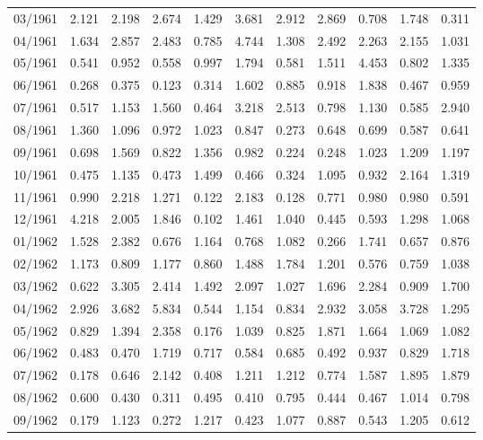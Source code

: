 \begin{tabular}{lrrrrrrrrrr}
03/1961 &  2.121 &  2.198 &  2.674 &  1.429 &  3.681 &  2.912 &  2.869 &  0.708 &  1.748 &  0.311 \\
04/1961 &  1.634 &  2.857 &  2.483 &  0.785 &  4.744 &  1.308 &  2.492 &  2.263 &  2.155 &  1.031 \\
05/1961 &  0.541 &  0.952 &  0.558 &  0.997 &  1.794 &  0.581 &  1.511 &  4.453 &  0.802 &  1.335 \\
06/1961 &  0.268 &  0.375 &  0.123 &  0.314 &  1.602 &  0.885 &  0.918 &  1.838 &  0.467 &  0.959 \\
07/1961 &  0.517 &  1.153 &  1.560 &  0.464 &  3.218 &  2.513 &  0.798 &  1.130 &  0.585 &  2.940 \\
08/1961 &  1.360 &  1.096 &  0.972 &  1.023 &  0.847 &  0.273 &  0.648 &  0.699 &  0.587 &  0.641 \\
09/1961 &  0.698 &  1.569 &  0.822 &  1.356 &  0.982 &  0.224 &  0.248 &  1.023 &  1.209 &  1.197 \\
10/1961 &  0.475 &  1.135 &  0.473 &  1.499 &  0.466 &  0.324 &  1.095 &  0.932 &  2.164 &  1.319 \\
11/1961 &  0.990 &  2.218 &  1.271 &  0.122 &  2.183 &  0.128 &  0.771 &  0.980 &  0.980 &  0.591 \\
12/1961 &  4.218 &  2.005 &  1.846 &  0.102 &  1.461 &  1.040 &  0.445 &  0.593 &  1.298 &  1.068 \\
01/1962 &  1.528 &  2.382 &  0.676 &  1.164 &  0.768 &  1.082 &  0.266 &  1.741 &  0.657 &  0.876 \\
02/1962 &  1.173 &  0.809 &  1.177 &  0.860 &  1.488 &  1.784 &  1.201 &  0.576 &  0.759 &  1.038 \\
03/1962 &  0.622 &  3.305 &  2.414 &  1.492 &  2.097 &  1.027 &  1.696 &  2.284 &  0.909 &  1.700 \\
04/1962 &  2.926 &  3.682 &  5.834 &  0.544 &  1.154 &  0.834 &  2.932 &  3.058 &  3.728 &  1.295 \\
05/1962 &  0.829 &  1.394 &  2.358 &  0.176 &  1.039 &  0.825 &  1.871 &  1.664 &  1.069 &  1.082 \\
06/1962 &  0.483 &  0.470 &  1.719 &  0.717 &  0.584 &  0.685 &  0.492 &  0.937 &  0.829 &  1.718 \\
07/1962 &  0.178 &  0.646 &  2.142 &  0.408 &  1.211 &  1.212 &  0.774 &  1.587 &  1.895 &  1.879 \\
08/1962 &  0.600 &  0.430 &  0.311 &  0.495 &  0.410 &  0.795 &  0.444 &  0.467 &  1.014 &  0.798 \\
09/1962 &  0.179 &  1.123 &  0.272 &  1.217 &  0.423 &  1.077 &  0.887 &  0.543 &  1.205 &  0.612 \\

\end{tabular}
